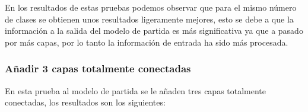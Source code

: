 \documentclass[12pt,a4paper]{article}
\begin{document}
\begin{table}[H]
\centering
{}
\caption{Resultados prueba usando modelo basado en la arquitectura \textit{resnet v2 512}.}
\end{table}

En los resultados de estas pruebas podemos observar que para el mismo número de clases se obtienen unos resultados ligeramente mejores, esto se debe a que la información a la salida del modelo de partida es más significativa ya que a pasado por más capas, por lo tanto la información de entrada ha sido más procesada.

\subsubsection{Añadir 3 capas totalmente conectadas}
En esta prueba al modelo de partida se le añaden tres capas totalmente conectadas, los resultados son los siguientes:
\end{document}
